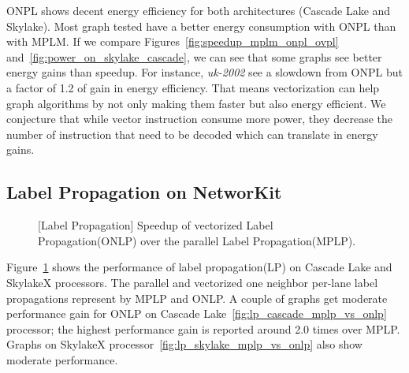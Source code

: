 \documentclass[default,iicol]{sn-jnl}%
\theoremstyle{thmstyleone}%
\theoremstyle{thmstyletwo}%
\theoremstyle{thmstylethree}%
\begin{document}
ONPL shows decent energy efficiency for both architectures (Cascade
Lake and Skylake). Most graph tested have a better energy consumption
with ONPL than with MPLM. If we compare
Figures~\ref{fig:speedup_mplm_onpl_ovpl}
and~\ref{fig:power_on_skylake_cascade}, we can see that some graphs
see better energy gains than speedup. For instance, \textit{uk-2002}
see a slowdown from ONPL but a factor of 1.2 of gain in energy
efficiency. That means vectorization can help graph algorithms by not
only making them faster but also energy efficient. We conjecture that
while vector instruction consume more power, they decrease the number
of instruction that need to be decoded which can translate in energy gains.


\subsection{Label Propagation on NetworKit}
\begin{figure}[t]
  \centering
    \caption{[Label Propagation] Speedup of vectorized Label Propagation(ONLP) over the parallel Label Propagation(MPLP).} 
  	\label{fig:lp_mplp_onlp_skl_cascade}
\end{figure}

Figure~\ref{fig:lp_mplp_onlp_skl_cascade} shows the performance of
label propagation(LP) on Cascade Lake and SkylakeX processors. The
parallel and vectorized one neighbor per-lane label propagations
represent by MPLP and ONLP. A couple of graphs get moderate
performance gain for ONLP on Cascade
Lake~\ref{fig:lp_cascade_mplp_vs_onlp} processor; the highest
performance gain is reported around 2.0 times over MPLP. Graphs on
SkylakeX processor~\ref{fig:lp_skylake_mplp_vs_onlp} also show
moderate performance.
\end{document}
